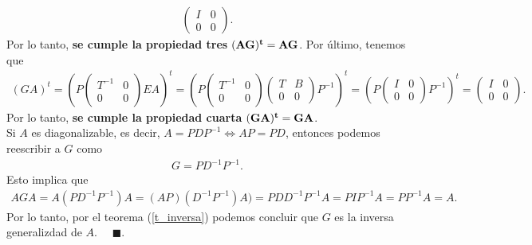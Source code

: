 \documentclass[11pt,letterpaper]{article}
\newcommand{\fin}{$\blacksquare.$}
\begin{document}
\begin{enumerate}
\begin{align*}
\begin{pmatrix}
I & 0 \\
0 & 0
\end{pmatrix}.
\end{align*}
Por lo tanto, \textbf{se cumple la propiedad tres} $\bf (AG)^t = AG$. Por último, tenemos que 
\begin{align*}
(GA)^t = \left(P \begin{pmatrix}
T^{-1} & 0 \\
0 & 0
\end{pmatrix}EA \right)^t= \left(P \begin{pmatrix}
T^{-1} & 0 \\
0 & 0
\end{pmatrix}\begin{pmatrix}
T & B\\
0 & 0
\end{pmatrix}P^{-1} \right)^t = \left( P\begin{pmatrix}
I & 0\\
0 & 0
\end{pmatrix}P^{-1} \right)^t=\begin{pmatrix}
I & 0\\
0&0
\end{pmatrix}.
\end{align*}
Por lo tanto, \textbf{se cumple la propiedad cuarta} $\bf (GA)^t = GA$.\\

Si $A$ es diagonalizable, es decir, $A=PDP^{-1}\Leftrightarrow AP=PD$, entonces podemos reescribir a $G$ como
\begin{align*}
G=PD^{-1}P^{-1}.
\end{align*}
Esto implica que 
\begin{align*}
AGA=A(PD^{-1}P^{-1})A = (AP)(D^{-1}P^{-1})A)=PDD^{-1}P^{-1}A=PIP^{-1}A=PP^{-1}A=A.
\end{align*}
Por lo tanto, por el teorema (\ref{t_inversa}) podemos concluir que $G$ es la inversa generalizdad de $A$. \ \ \fin


\end{enumerate}
\end{document}
